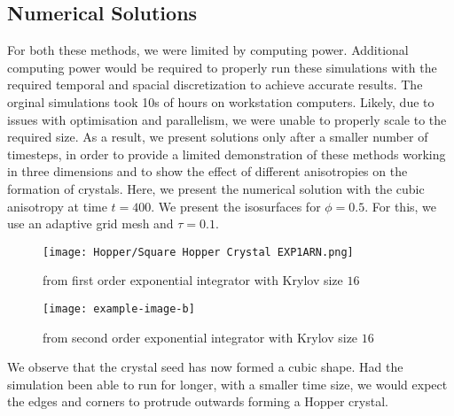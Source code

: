 \subsection{Numerical Solutions}
For both these methods, we were limited by computing power.
Additional computing power would be required to properly run these simulations with the required temporal and spacial discretization to achieve accurate results.
The orginal simulations took 10s of hours on workstation computers.
Likely, due to issues with optimisation and parallelism, we were unable to properly scale to the required size.
As a result, we present solutions only after a smaller number of timesteps, in order to provide a limited demonstration of these methods working in three dimensions and to show the effect of different anisotropies on the formation of crystals.
Here, we present the numerical solution with the cubic anisotropy at time $t=400$.
We present the isosurfaces for $\phi = 0.5$.
For this, we use an adaptive grid mesh and $\tau = 0.1$.
\begin{figure}[H]
    \centering
    \begin{minipage}{0.49\textwidth}
        \texttt{[image: Hopper/Square Hopper Crystal EXP1ARN.png]} %
        \caption{from first order exponential integrator with Krylov size $16$}
        \label{fig:first order 8 0.5}
    \end{minipage}\hfill
    \centering
    \begin{minipage}{0.49\textwidth}
        \texttt{[image: example-image-b]} %
        \caption{from second order exponential integrator with Krylov size $16$}
        \label{fig:first order 10 0.5}
    \end{minipage}\hfill
\end{figure}
We observe that the crystal seed has now formed a cubic shape.
Had the simulation been able to run for longer, with a smaller time size, we would expect the edges and corners to protrude outwards forming a Hopper crystal.


